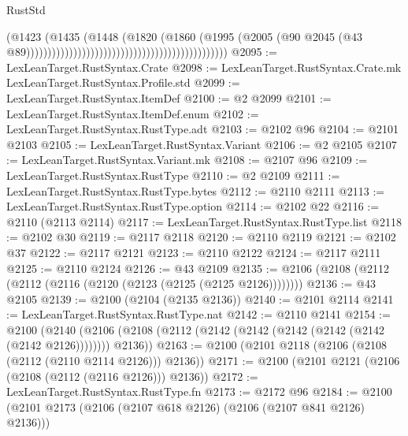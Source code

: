 \begin{lexlean}{RustStd}
\begin{coremodule}
{\begin{coremodule}
{{{{{{{{{{{{{{{{{{{{{{{{{{{{{{{{{{{{{{{{{{{{{{{{{{                                                                                (@1423
                                                                                  (@1435
                                                                                    (@1448
                                                                                      (@1820
                                                                                        (@1860
                                                                                          (@1995
                                                                                            (@2005
                                                                                              (@90
                                                                                                @2045
                                                                                                (@43
                                                                                                  @89)))))))))))))))))))))))))))))))))))))))))))))))
@2095 := LexLeanTarget.RustSyntax.Crate
@2098 := LexLeanTarget.RustSyntax.Crate.mk LexLeanTarget.RustSyntax.Profile.std
@2099 := LexLeanTarget.RustSyntax.ItemDef
@2100 := @2 @2099
@2101 := LexLeanTarget.RustSyntax.ItemDef.enum
@2102 := LexLeanTarget.RustSyntax.RustType.adt
@2103 := @2102 @96
@2104 := @2101 @2103
@2105 := LexLeanTarget.RustSyntax.Variant
@2106 := @2 @2105
@2107 := LexLeanTarget.RustSyntax.Variant.mk
@2108 := @2107 @96
@2109 := LexLeanTarget.RustSyntax.RustType
@2110 := @2 @2109
@2111 := LexLeanTarget.RustSyntax.RustType.bytes
@2112 := @2110 @2111
@2113 := LexLeanTarget.RustSyntax.RustType.option
@2114 := @2102 @22
@2116 := @2110 (@2113 @2114)
@2117 := LexLeanTarget.RustSyntax.RustType.list
@2118 := @2102 @30
@2119 := @2117 @2118
@2120 := @2110 @2119
@2121 := @2102 @37
@2122 := @2117 @2121
@2123 := @2110 @2122
@2124 := @2117 @2111
@2125 := @2110 @2124
@2126 := @43 @2109
@2135 := @2106 (@2108 (@2112 (@2112 (@2116 (@2120 (@2123 (@2125 (@2125 @2126))))))))
@2136 := @43 @2105
@2139 := @2100 (@2104 (@2135 @2136))
@2140 := @2101 @2114
@2141 := LexLeanTarget.RustSyntax.RustType.nat
@2142 := @2110 @2141
@2154 := @2100
    (@2140 (@2106 (@2108 (@2112 (@2142 (@2142 (@2142 (@2142 (@2142 (@2142 @2126)))))))) @2136))
@2163 := @2100 (@2101 @2118 (@2106 (@2108 (@2112 (@2110 @2114 @2126))) @2136))
@2171 := @2100 (@2101 @2121 (@2106 (@2108 (@2112 (@2116 @2126))) @2136))
@2172 := LexLeanTarget.RustSyntax.RustType.fn
@2173 := @2172 @96
@2184 := @2100 (@2101 @2173 (@2106 (@2107 @618 @2126) (@2106 (@2107 @841 @2126) @2136)))
}}}}}}}}}}}}}}}}}}}}}}}}}}}}}}}}}}}}}}}}}}}}}}}}}}
\end{coremodule}}
\end{coremodule}
\end{lexlean}
